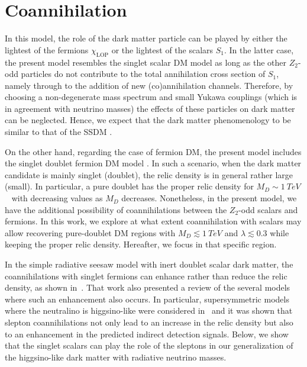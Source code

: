 \section{Coannihilation }
\label{sec:singlet-doublet-dark}
In this model, the role of the dark matter particle can be played by
either the lightest of the fermions $\chi_{\text{LOP}}$ or the lightest of the
scalars $S_1$. 
In the latter case, the present model resembles the
singlet scalar DM model
\cite{Silveira:1985rk,McDonald:1993ex,Burgess:2000yq} as long as the
other $Z_2$-odd particles do not contribute to the total annihilation
cross section of $S_1$, namely through to the addition of new
(co)annihilation channels. 
Therefore, by choosing a non-degenerate mass spectrum and small Yukawa
couplings (which is in agreement with neutrino masses) the effects of these particles on dark matter can be neglected. 
Hence, we expect that the dark matter phenomenology to be similar to
that of the SSDM \cite{Cline:2013gha}. 

On the other hand, regarding the case of fermion DM, the present model includes the
singlet doublet fermion DM model
\cite{ArkaniHamed:2005yv,Mahbubani:2005pt,D'Eramo:2007ga,Enberg:2007rp,Cohen:2011ec,Cheung:2013dua}.
In such a scenario, when the dark matter candidate is mainly singlet
(doublet), the relic density is in general rather large (small). 
In particular, a pure doublet has the proper relic density for
$M_{D}\sim\SI{1}{TeV}$~\cite{Mahbubani:2005pt,Cheung:2013dua,Chattopadhyay:2005mv}
with decreasing  values as $M_D$ decreases.  
Nonetheless, in the present model, we have the additional possibility
of coannihilations between the $Z_2$-odd scalars and fermions. 
In this work, we explore at what extent coannihilation with
scalars may allow recovering pure-doublet DM regions with
$M_D\lesssim\SI{1}{TeV}$ and $\lambda\lesssim0.3$ while keeping the
proper relic density.  
Hereafter, we focus in that specific region.


In the simple radiative seesaw model with inert
doublet scalar dark matter, the coannihilations with singlet fermions can enhance
rather than reduce the relic density, as shown in~\cite{Klasen:2013jpa}. That work also presented a review of the several
models~\cite{Servant:2002aq,Kong:2005hn,Burnell:2005hm,Edsjo:2003us,Profumo:2006bx}
where such an enhancement also occurs.
In particular, supersymmetric models where
the neutralino is higgsino-like were considered in~\cite{Profumo:2006bx} and it
was shown that slepton coannihilations not only lead to an increase in
the relic density but also to an enhancement in the predicted
indirect detection signals. 
Below, we show that the singlet scalars can play the role of the
sleptons in our generalization of the higgsino-like dark matter with
radiative neutrino masses.


